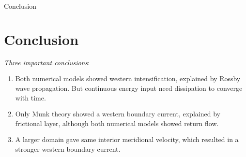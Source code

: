 \begin{frame}{Conclusion}
  \section{Conclusion}
 
\textit{Three important conclusions}:
\begin{enumerate}
    \item Both numerical models showed western intensification, explained by Rossby wave propagation. But continuous energy input need dissipation to converge with time. 
    \item Only Munk theory showed a western boundary current, explained by frictional layer, although both numerical models showed return flow.
    \item A larger domain gave same interior meridional velocity, which resulted in a stronger western boundary current.
\end{enumerate}
\end{frame}
